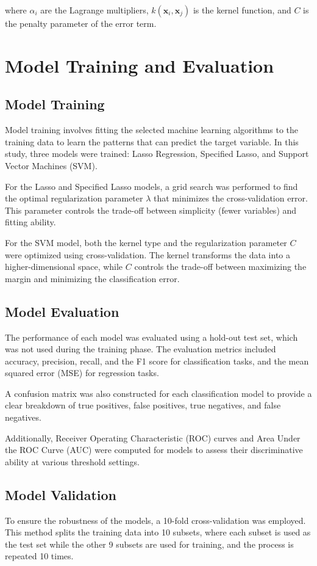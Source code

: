 \documentclass[12pt]{article}
\begin{document}
where $\alpha_i$ are the Lagrange multipliers, $k(\mathbf{x}_i, \mathbf{x}_j)$ is the kernel function, and $C$ is the penalty parameter of the error term.



\section{Model Training and Evaluation}

\subsection{Model Training}
Model training involves fitting the selected machine learning algorithms to the training data to learn the patterns that can predict the target variable. In this study, three models were trained: Lasso Regression, Specified Lasso, and Support Vector Machines (SVM).

For the Lasso and Specified Lasso models, a grid search was performed to find the optimal regularization parameter \(\lambda\) that minimizes the cross-validation error. This parameter controls the trade-off between simplicity (fewer variables) and fitting ability.

For the SVM model, both the kernel type and the regularization parameter \(C\) were optimized using cross-validation. The kernel transforms the data into a higher-dimensional space, while \(C\) controls the trade-off between maximizing the margin and minimizing the classification error.

\subsection{Model Evaluation}
The performance of each model was evaluated using a hold-out test set, which was not used during the training phase. The evaluation metrics included accuracy, precision, recall, and the F1 score for classification tasks, and the mean squared error (MSE) for regression tasks.

A confusion matrix was also constructed for each classification model to provide a clear breakdown of true positives, false positives, true negatives, and false negatives.

Additionally, Receiver Operating Characteristic (ROC) curves and Area Under the ROC Curve (AUC) were computed for models to assess their discriminative ability at various threshold settings.

\subsection{Model Validation}
To ensure the robustness of the models, a 10-fold cross-validation was employed. This method splits the training data into 10 subsets, where each subset is used as the test set while the other 9 subsets are used for training, and the process is repeated 10 times.
\end{document}
